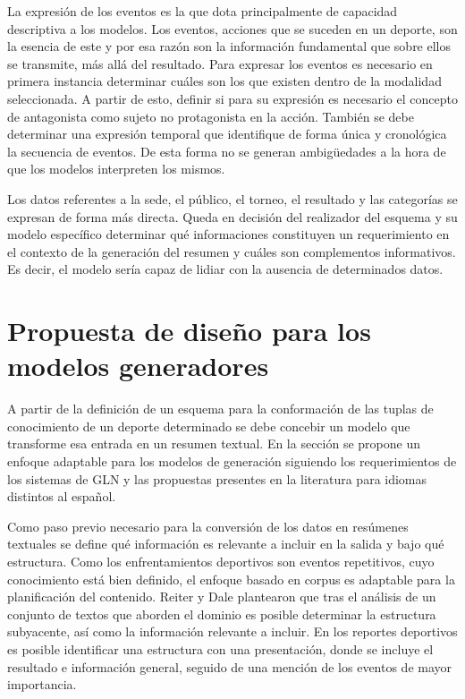     La expresión de los eventos es la que dota principalmente de capacidad descriptiva a los modelos. Los eventos, acciones que se suceden en un deporte, son la esencia de 
este y por esa razón son la información fundamental que sobre ellos se transmite, más allá del resultado. Para expresar los eventos es necesario en primera instancia determinar cuáles 
son los que existen dentro de la modalidad seleccionada. A partir de esto, definir si para su expresión es necesario el concepto de antagonista como sujeto no protagonista en la acción.
También se debe determinar una expresión temporal que identifique de forma única y cronológica la secuencia de eventos. De esta forma no se generan ambigüedades a la hora de que los 
modelos interpreten los mismos.

    Los datos referentes a la sede, el público, el torneo, el resultado y las categorías se expresan de forma más directa. Queda en decisión del realizador del esquema y su modelo específico 
determinar qué informaciones constituyen un requerimiento en el contexto de la generación del resumen y cuáles son complementos informativos. Es decir, el modelo sería capaz de lidiar con 
la ausencia de determinados datos. 


\section{Propuesta de diseño para los modelos generadores}

    A partir de la definición de un esquema para la conformación de las tuplas de conocimiento de un deporte determinado se debe concebir 
un modelo que transforme esa entrada en un resumen textual. En la sección se propone un enfoque adaptable para los modelos de generación siguiendo 
los requerimientos de los sistemas de GLN y las propuestas presentes en la literatura para idiomas distintos al español.

    Como paso previo necesario para la conversión de los datos en resúmenes textuales se define qué información es relevante a 
incluir en la salida y bajo qué estructura. Como los enfrentamientos deportivos son eventos repetitivos, cuyo conocimiento está bien 
definido, el enfoque basado en corpus es adaptable para la planificación del contenido. Reiter y Dale  plantearon que tras 
el análisis de un conjunto de textos que aborden el dominio es posible determinar la estructura subyacente, así como la información relevante a incluir. 
En los reportes deportivos es posible identificar una estructura con una presentación, donde se incluye el resultado e información general, 
seguido de una mención de los eventos de mayor importancia. 


